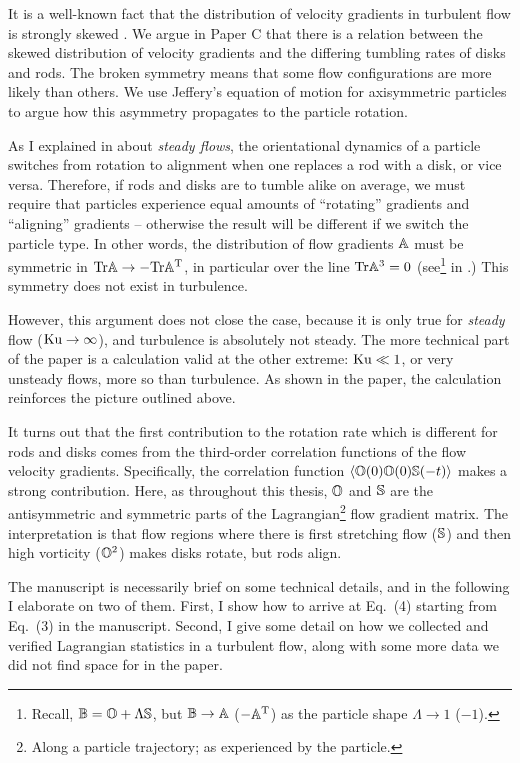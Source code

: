 \documentclass[thesis.tex]{subfiles}
\begin{document}
It is a well-known fact that the distribution of velocity gradients in turbulent flow is strongly skewed \cite{chertkov1999,luthi2009}. We argue in Paper C that there is a relation between the skewed distribution of velocity gradients and the differing tumbling rates of disks and rods. The broken symmetry means that some flow configurations are more likely than others. We use Jeffery's equation of motion for axisymmetric particles to argue how this asymmetry propagates to the particle rotation. 

As I explained in  about \emph{steady flows}, the orientational dynamics of a particle switches from rotation to alignment when one replaces a rod with a disk, or vice versa. Therefore, if rods and disks are to tumble alike on average, we must require that particles experience equal amounts of ``rotating'' gradients and ``aligning'' gradients -- otherwise the result will be different if we switch the particle type.
In other words, the distribution of flow gradients $\mathbb{A}$ must be symmetric in $\mbox{Tr} \mathbb{A} \to -\mbox{Tr} \mathbb{A}^{\mathrm T}$, in particular over the line $\mbox{Tr} \mathbb{A}^3=0$ (see\footnote{Recall, $\mathbb{B}=\mathbb{O} + \Lambda\mathbb{S}$, but $\mathbb{B} \to \mathbb{A}$ ($-\mathbb{A}^{\mathrm T}$) as the particle shape $\Lambda\to 1$ ($-1$).}  in .) This symmetry does not exist in turbulence.

However, this argument does not close the case, because it is only true for \emph{steady} flow ($\mbox{Ku}\to\infty$), and turbulence is absolutely not steady. The more technical part of the paper is a calculation valid at the other extreme: $\mbox{Ku} \ll 1$, or very unsteady flows, more so than turbulence. As shown in the paper, the calculation reinforces the picture outlined above.

It turns out that the first contribution to the rotation rate which is different for rods and disks comes from the third-order correlation functions of the flow velocity gradients. Specifically, the correlation function $\langle \mathbb{O}(0) \mathbb{O}(0) \mathbb{S}(-t)\rangle$ makes a strong contribution. Here, as throughout this thesis, $\mathbb{O}$ and $\mathbb{S}$ are the antisymmetric and symmetric parts of the Lagrangian\footnote{Along a particle trajectory; as experienced by the particle.} flow gradient matrix. The interpretation is that flow regions where there is first stretching flow ($\mathbb{S}$) and then high vorticity ($\mathbb{O}^2$) makes disks rotate, but rods align.

The manuscript is necessarily brief on some technical details, and in the following I elaborate on two of them. First, I show how to arrive at Eq.~(4) starting from Eq.~(3) in the manuscript. Second, I give some detail on how we collected and verified Lagrangian statistics in a turbulent flow, along with some more data we did not find space for in the paper.
\end{document}
